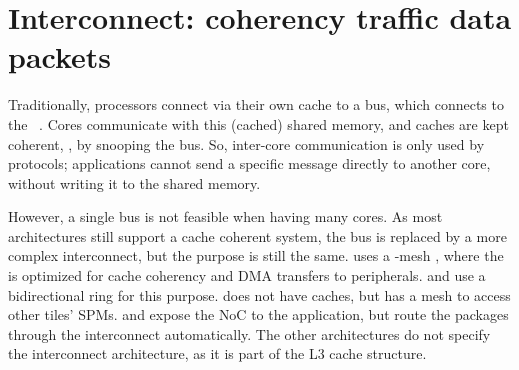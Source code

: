 \section{Interconnect: coherency traffic \texorpdfstring{\protect\vs}{vs.} data packets}
\label{s:trends:noc}


Traditionally, processors connect via their own cache to a bus, which connects to the ~\cite{culler:comp_arch}.
Cores communicate with this (cached) shared memory, and caches are kept coherent, \eg, by snooping the bus.
So, inter-core communication is only used by  protocols; applications cannot send a specific message directly to another core, without writing it to the shared memory.

However, a single bus is not feasible when having many cores.
As most architectures still support a cache coherent system, the bus is replaced by a more complex interconnect, but the purpose is still the same.
\TILEGx uses a -mesh , where the  is optimized for cache coherency and \ac{DMA} transfers to peripherals.
\Inteliseven and \XeonPhi use a bidirectional ring for this purpose.
\Epiphany does not have caches, but has a  mesh to access other tiles' \acp{SPM}.
\IntelSCC and \TILEGx expose the \ac{NoC} to the application, but route the packages through the interconnect automatically.
The other architectures do not specify the interconnect architecture, as it is part of the L3 cache structure.

